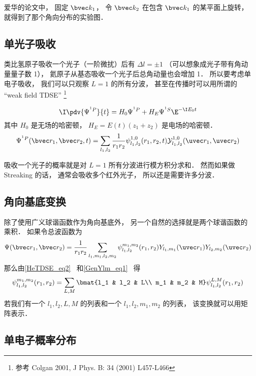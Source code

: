 爱华的论文中， 固定 $\bvec k_1$， 令 $\bvec k_2$ 在包含 $\bvec k_1$ 的某平面上旋转， 就得到了那个角向分布的实验图．

\subsection{单光子吸收}

类比氢原子吸收一个光子（一阶微扰）后有 $\Delta l = \pm 1$ （可以想象成光子带有角动量量子数 1）， 氦原子从基态吸收一个光子后总角动量也会增加 1． 所以要考虑单电子吸收， 我们可以只观察 $L = 1$ 的所有分波， 甚至在传播时可以用所谓的 “weak field TDSE” \footnote{参考 Colgan 2001, J Phys. B: 34 (2001) L457-L466}

\begin{equation}
\I \pdv{\Psi^{^1P}}{t} = H_0 \Psi^{^1P} + H_E \Psi^{^1S} \E^{-\I E_0 t}
\end{equation}
其中 $H_0$ 是无场的哈密顿， $H_E = E(t) (z_1 + z_2)$ 是电场的哈密顿．
\begin{equation}
\Psi^{^1P}(\bvec r_1, \bvec r_2, t) = \sum_{l_1, l_2} \frac{1}{r_1 r_2} \psi_{l_1, l_2}^{1, 0} (r_1, r_2, t) \mathcal Y_{l_1, l_2}^{1, 0} (\uvec r_1, \uvec r_2)
\end{equation}

吸收一个光子的概率就是对 $L = 1$ 所有分波进行模方积分求和． 然而如果做 Streaking 的话， 通常会吸收多个红外光子， 所以还是需要许多分波．

\subsection{角向基底变换}
除了使用广义球谐函数作为角向基底外， 另一个自然的选择就是两个球谐函数的乘积． 如果令总波函数为
\begin{equation}\label{HeAnal_eq6}
\Psi(\bvec r_1, \bvec r_2) = \frac{1}{r_1 r_2} \sum_{l_1, m_1, l_2, m_2} \psi_{l_1, l_2}^{m_1, m_2}(r_1, r_2) Y_{l_1, m_1}(\uvec r_1) Y_{l_2, m_2} (\uvec r_2)
\end{equation}
那么由\autoref{HeTDSE_eq2}~ 和\autoref{GenYlm_eq1}~ 得
\begin{equation}\label{HeAnal_eq7}
\psi_{l_1, l_2}^{m_1, m_2}(r_1, r_2) = \sum_{L,M} \bmat{l_1 & l_2 & L\\ m_1 & m_2 & M} \psi_{l_1, l_2}^{L,M}(r_1, r_2)
\end{equation}
若我们有一个 $l_1, l_2, L, M$ 的列表和一个 $l_1, l_2, m_1, m_2$ 的列表， 该变换就可以用矩阵表示．

\subsection{单电子概率分布}

